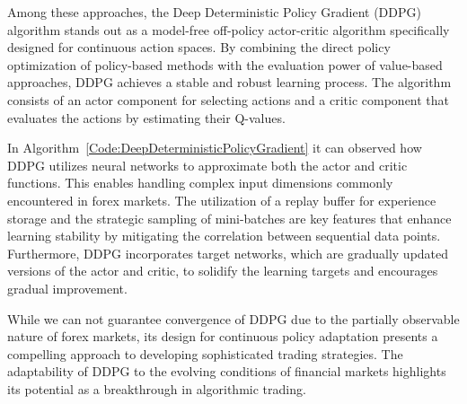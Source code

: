 Among these approaches, the Deep Deterministic Policy Gradient (DDPG) algorithm stands out as a model-free off-policy actor-critic algorithm specifically designed for continuous action spaces. By combining the direct policy optimization of policy-based methods with the evaluation power of value-based approaches, DDPG achieves a stable and robust learning process. The algorithm consists of an actor component for selecting actions and a critic component that evaluates the actions by estimating their Q-values.



In Algorithm~\ref{Code:DeepDeterministicPolicyGradient} it can observed how DDPG utilizes neural networks to approximate both the actor and critic functions. This enables handling complex input dimensions commonly encountered in forex markets. The utilization of a replay buffer for experience storage and the strategic sampling of mini-batches are key features that enhance learning stability by mitigating the correlation between sequential data points. Furthermore, DDPG incorporates target networks, which are gradually updated versions of the actor and critic, to solidify the learning targets and encourages gradual improvement.

While we can not guarantee convergence of DDPG due to the partially observable nature of forex markets, its design for continuous policy adaptation presents a compelling approach to developing sophisticated trading strategies. The adaptability of DDPG to the evolving conditions of financial markets highlights its potential as a breakthrough in algorithmic trading.
